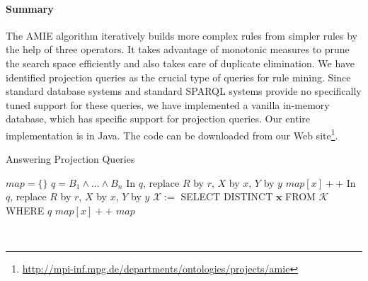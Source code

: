 {\paragraph{Summary}
The AMIE algorithm iteratively builds more complex rules from simpler rules by the help of three operators.
It takes advantage of monotonic measures to prune the search space efficiently and also takes care of duplicate elimination.
We have identified projection queries as the crucial type of queries for rule mining.
Since standard database systems and standard SPARQL systems provide no specifically tuned support for these queries,
we have implemented a vanilla in-memory database, which has specific support for projection queries.
Our entire implementation is in Java. The code can be downloaded from our Web site\footnote{\url{http://mpi-inf.mpg.de/departments/ontologies/projects/amie}}.


\begin{algorithm}
\caption{Answering Projection Queries}
\label{algi}
\begin{algorithmic}[1]
    \State $map = \{\}$
    \State $q=B_1 \wedge ... \wedge B_n$
	    \State In $q$, replace $R$ by $r$, $X$ by $x$, $Y$ by $y$
		\State $map[x]++$
	    \EndIf
	  \EndFor
	\Else
	    \State In $q$, replace $R$ by $r$, $X$ by $x$, $Y$ by $y$
	    \State $\mathcal{X} :=$ SELECT DISTINCT $\bm{x}$ FROM $\mathcal{K}$ WHERE $q$
		  \State $map[x]++$
	    \EndFor
	  \EndFor
	\EndIf
	\State \Return $map$
\EndFunction
\end{algorithmic}
\end{algorithm}
\ \\[-1cm]
}
